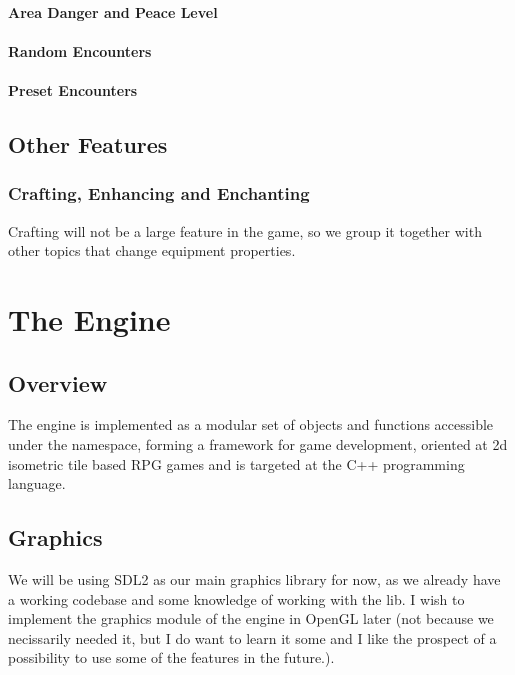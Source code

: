 \documentclass[a4paper,10pt]{book}
\begin{document}
\subsection{Area Danger and Peace Level}
\subsection{Random Encounters}
\subsection{Preset Encounters}

\chapter{Other Features}

\section{Crafting, Enhancing and Enchanting}
Crafting will not be a large feature in the game, so we group it together with
other topics that change equipment properties.

\part{The Engine}
\chapter{Overview}
The engine is implemented as a modular set of objects and functions accessible
under the
\codew{\enginenamespace{}} namespace, forming a framework for game development,
oriented at 2d isometric tile based RPG games and is targeted at the C++
programming language.
\chapter{Graphics}
We will be using SDL2 as our main graphics library for now, as we already have
a working codebase and some knowledge of working with the lib. I wish to
implement the graphics module of the engine in OpenGL later (not because we
necissarily needed it, but I do want to learn it some and I like the prospect
of a possibility to use some of the features in the future.).
\end{document}
